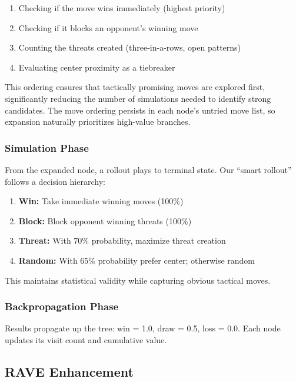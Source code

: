 \documentclass[11pt]{article}
\begin{document}
\begin{enumerate}
    \item Checking if the move wins immediately (highest priority)
    \item Checking if it blocks an opponent's winning move
    \item Counting the threats created (three-in-a-rows, open patterns)
    \item Evaluating center proximity as a tiebreaker
\end{enumerate}

This ordering ensures that tactically promising moves are explored first, significantly reducing the number of simulations needed to identify strong candidates. The move ordering persists in each node's untried move list, so expansion naturally prioritizes high-value branches.

\subsubsection{Simulation Phase}
\label{sec:simulation}

From the expanded node, a rollout plays to terminal state. Our ``smart rollout'' follows a decision hierarchy:

\begin{enumerate}
    \item \textbf{Win:} Take immediate winning moves (100\%)
    \item \textbf{Block:} Block opponent winning threats (100\%)
    \item \textbf{Threat:} With 70\% probability, maximize threat creation
    \item \textbf{Random:} With 65\% probability prefer center; otherwise random
\end{enumerate}

This maintains statistical validity while capturing obvious tactical moves.

\subsubsection{Backpropagation Phase}

Results propagate up the tree: win = 1.0, draw = 0.5, loss = 0.0. Each node updates its visit count and cumulative value.

\subsection{RAVE Enhancement}
\end{document}
